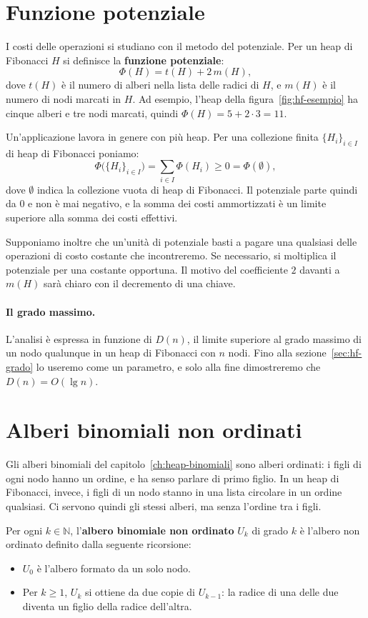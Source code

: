 \section{Funzione potenziale}\label{sec:hf-potenziale}
I costi delle operazioni si studiano con il metodo del potenziale. Per un heap di Fibonacci $H$ si definisce la \textbf{funzione potenziale}:
\[
\Phi(H) = t(H) + 2\, m(H),
\]
dove $t(H)$ è il numero di alberi nella lista delle radici di $H$, e $m(H)$ è il numero di nodi marcati in $H$. Ad esempio, l'heap della figura~\ref{fig:hf-esempio} ha cinque alberi e tre nodi marcati, quindi $\Phi(H) = 5 + 2 \cdot 3 = 11$.

Un'applicazione lavora in genere con più heap. Per una collezione finita $\{H_i\}_{i \in I}$ di heap di Fibonacci poniamo:
\[
\Phi\bigl(\{H_i\}_{i \in I}\bigr) = \sum_{i \in I} \Phi(H_i) \ge 0 = \Phi(\emptyset),
\]
dove $\emptyset$ indica la collezione vuota di heap di Fibonacci. Il potenziale parte quindi da $0$ e non è mai negativo, e la somma dei costi ammortizzati è un limite superiore alla somma dei costi effettivi.

Supponiamo inoltre che un'unità di potenziale basti a pagare una qualsiasi delle operazioni di costo costante che incontreremo. Se necessario, si moltiplica il potenziale per una costante opportuna. Il motivo del coefficiente $2$ davanti a $m(H)$ sarà chiaro con il decremento di una chiave.

\paragraph{Il grado massimo.}
L'analisi è espressa in funzione di $D(n)$, il limite superiore al grado massimo di un nodo qualunque in un heap di Fibonacci con $n$ nodi. Fino alla sezione~\ref{sec:hf-grado} lo useremo come un parametro, e solo alla fine dimostreremo che $D(n) = O(\lg n)$.

\section{Alberi binomiali non ordinati}\label{sec:hf-non-ordinati}
Gli alberi binomiali del capitolo~\ref{ch:heap-binomiali} sono alberi ordinati: i figli di ogni nodo hanno un ordine, e ha senso parlare di primo figlio. In un heap di Fibonacci, invece, i figli di un nodo stanno in una lista circolare in un ordine qualsiasi. Ci servono quindi gli stessi alberi, ma senza l'ordine tra i figli.

\begin{definizione}\label{def:albero-non-ordinato}
Per ogni $k \in \mathbb{N}$, l'\textbf{albero binomiale non ordinato} $U_k$ di grado $k$ è l'albero non ordinato definito dalla seguente ricorsione:
\begin{itemize}
    \item $U_0$ è l'albero formato da un solo nodo.
    \item Per $k \ge 1$, $U_k$ si ottiene da due copie di $U_{k-1}$: la radice di una delle due diventa un figlio della radice dell'altra.
\end{itemize}
\end{definizione}

